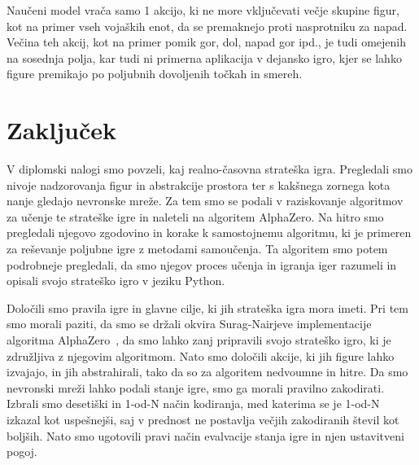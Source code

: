 \documentclass[a4paper, 12pt]{book}
\begin{document}
{Naučeni model vrača samo 1 akcijo, ki ne more vključevati večje skupine figur, kot na primer vseh vojaških enot, da se premaknejo proti nasprotniku za napad.
Večina teh akcij, kot na primer pomik gor, dol, napad gor ipd., je tudi omejenih na sosednja polja, kar tudi ni primerna aplikacija v dejansko igro, kjer se lahko figure premikajo po poljubnih dovoljenih točkah in smereh.


\chapter{Zaključek}
\label{chzakljucek}
V diplomski nalogi smo povzeli, kaj realno-časovna strateška igra.
Pregledali smo nivoje nadzorovanja figur in abstrakcije prostora ter s kakšnega zornega kota nanje gledajo nevronske mreže.
Za tem smo se podali v raziskovanje algoritmov za učenje te strateške igre in naleteli na algoritem AlphaZero.
Na hitro smo pregledali njegovo zgodovino in korake k samostojnemu algoritmu, ki je primeren za reševanje poljubne igre z metodami samoučenja.
Ta algoritem smo potem podrobneje pregledali, da smo njegov proces učenja in igranja iger razumeli in opisali svojo strateško igro v jeziku Python.

Določili smo pravila igre in glavne cilje, ki jih strateška igra mora imeti.
Pri tem smo morali paziti, da smo se držali okvira Surag-Nairjeve implementacije algoritma AlphaZero~\cite{alphazerogeneral}, da smo lahko zanj pripravili svojo strateško igro, ki je združljiva z njegovim algoritmom.
Nato smo določili akcije, ki jih figure lahko izvajajo, in jih abstrahirali, tako da so za algoritem nedvoumne in hitre.
Da smo nevronski mreži lahko podali stanje igre, smo ga morali pravilno zakodirati.
Izbrali smo desetiški in 1-od-N način kodiranja, med katerima se je 1-od-N izkazal kot uspešnejši, saj v prednost ne postavlja večjih zakodiranih števil kot boljših.
Nato smo ugotovili pravi način evalvacije stanja igre in njen ustavitveni pogoj.

}
\end{document}
